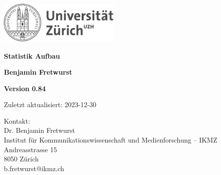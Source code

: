 \documentclass[
  10pt,
  letterpaper,
  a4paper, twoside]{scrreprt}
\title{}
\date{}
\begin{document}
\pagestyle{scrheadings}
\clearscrheadfoot
\ohead{\textcolor{headergray}{\pagemark}}

\ihead{\textcolor{headergray}{\headmark}}

\ofoot{}
\ifoot{}




\begin{titlepage}
\sffamily

\setlength\parindent{0pt}

\hfill \includegraphics[width = 6cm]{files/LaTeX/uzh_logo_d_pos.pdf}\par

\vspace{2cm}


{\bfseries\Huge Statistik
Aufbau \\[1cm] } %



{\bfseries \Large
 Benjamin Fretwurst  \\ [1cm]
}


 
\vfill
{\bfseries \Large Version 0.84  \\[1cm] } 


\vfill 

Zuletzt aktualisiert: 2023-12-30

\vfill

\begin{tabbing}
Kontakt:\\
Dr. Benjamin Fretwurst\\
Institut für Kommunikationswissenschaft und Medienforschung -- IKMZ\\
Andreasstrasse 15\\
8050 Zürich\\
b.fretwurst@ikmz.ch\\[0.3cm]
\end{tabbing}

\setlength\parindent{1em}

\end{titlepage}

\makeatletter
{}
\makeatletter
\end{document}
